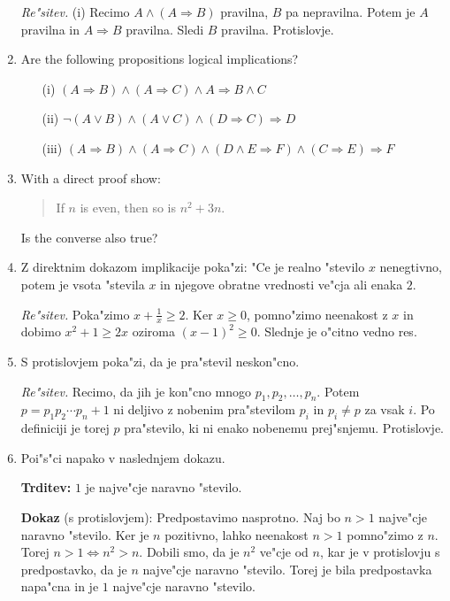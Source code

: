 \documentclass[11pt,paper=b5,footinclude,headinclude]{scrbook} %
\theoremstyle{remark}
\theoremstyle{definition} %
\theoremstyle{theorem} %
\begin{document}
\begin{enumerate}
\emph{Re"sitev.} (i) Recimo $A \wedge (A \Rightarrow B)$ pravilna, $B$ pa nepravilna. Potem je $A$ pravilna in $A\Rightarrow B$ pravilna. Sledi $B$ pravilna. Protislovje. 


\item Are the following propositions logical implications?
\begin{enumerate}
\item[(i)] $(A \Rightarrow B ) \wedge (A \Rightarrow C) \wedge A \Rightarrow B \wedge C$
\item[(ii)] $\neg (A \vee B) \wedge (A\vee C) \wedge (D\Rightarrow C) \Rightarrow D$
\item[(iii)] $(A\Rightarrow B) \wedge (A\Rightarrow C) \wedge (D\wedge E \Rightarrow F) \wedge (C\Rightarrow E) \Rightarrow F$
\end{enumerate}

\item With a direct proof show:
\begin{quote}
    If $n$ is even, then so is $n^2 +3n$.
\end{quote}
Is the converse also true?


\item Z direktnim dokazom implikacije poka"zi: "Ce je realno "stevilo $x$ nenegtivno, potem je vsota  "stevila $x$  in njegove obratne vrednosti  ve"cja ali enaka $2$.


\emph{ Re"sitev.} Poka"zimo $x + \frac{1}{x}\geq 2$. Ker $x\geq 0$, pomno"zimo neenakost z $x$ in dobimo
$x^2 + 1 \geq 2x$ oziroma $(x- 1)^2\geq 0$. Slednje je o"citno vedno res.

\item S protislovjem poka"zi, da je pra"stevil neskon"cno.

\emph{ Re"sitev.} Recimo, da jih je kon"cno mnogo $p_1,p_2,\ldots, p_n$. Potem  $p=p_1p_2\cdots p_n+1$ ni deljivo z nobenim pra"stevilom $p_i$ in $p_i\neq p$ za vsak $i$. Po definiciji je torej $p$ pra"stevilo, ki ni enako nobenemu prej"snjemu. Protislovje.

\item Poi"s"ci napako v naslednjem dokazu. 

\textbf{Trditev:} $1$ je najve"cje naravno "stevilo. 

\textbf{Dokaz} (s protislovjem):
Predpostavimo nasprotno. Naj bo $n>1$ najve"cje naravno "stevilo. Ker je $n$ pozitivno, lahko neenakost $n>1$ pomno"zimo z $n$. Torej $n>1\Leftrightarrow n^2>n$. Dobili smo, da je $n^2$ ve"cje od $n$, kar je v protislovju s predpostavko, da je $n$ najve"cje naravno "stevilo. Torej je bila predpostavka napa"cna in je $1$ najve"cje naravno "stevilo.


\end{enumerate}
\end{document}
